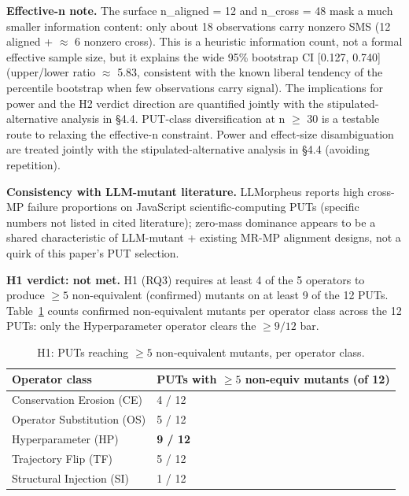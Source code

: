 \documentclass[review,12pt,authoryear]{elsarticle}
\begin{document}
\textbf{Effective-n note.} The surface n\_aligned = 12 and n\_cross = 48
mask a much smaller information content: only about 18 observations carry
nonzero SMS (12 aligned + $\approx$ 6 nonzero cross). This is a heuristic
information count, not a formal effective sample size, but it explains the
wide 95\% bootstrap CI {[}0.127, 0.740{]} (upper/lower ratio $\approx$
5.83, consistent with the known liberal tendency of the percentile
bootstrap when few observations carry signal). The implications for power and the H2 verdict direction are
quantified jointly with the stipulated-alternative analysis in §4.4.
PUT-class diversification at n $\geq$ 30 is a testable route to relaxing
the effective-n constraint. Power and effect-size disambiguation are
treated jointly with the stipulated-alternative analysis in §4.4
(avoiding repetition).

\textbf{Consistency with LLM-mutant literature.} \citet{tip2025llmorpheus}
LLMorpheus reports high cross-MP failure proportions on JavaScript
scientific-computing PUTs (specific numbers not listed in cited
literature); zero-mass dominance appears to be a shared characteristic
of LLM-mutant + existing MR-MP alignment designs, not a quirk of this
paper's PUT selection.

\textbf{H1 verdict: not met.} H1 (RQ3) requires at least 4 of the 5
operators to produce $\geq 5$ non-equivalent (confirmed) mutants on at
least 9 of the 12 PUTs. Table~\ref{tab:p2-32} counts confirmed
non-equivalent mutants per operator class across the 12 PUTs: only the
Hyperparameter operator clears the $\geq 9/12$ bar.

{\def\LTcaptype{table} %
\begin{longtable}[]{@{}ll@{}}
\caption{H1: PUTs reaching $\geq 5$ non-equivalent mutants, per operator
class.}\label{tab:p2-32}\\
\toprule\noalign{}
Operator class & PUTs with $\geq 5$ non-equiv mutants (of 12) \\
\midrule\noalign{}
\endfirsthead
\endhead
\bottomrule\noalign{}
\endlastfoot
Conservation Erosion (CE) & 4 / 12 \\
Operator Substitution (OS) & 5 / 12 \\
Hyperparameter (HP) & \textbf{9 / 12} \\
Trajectory Flip (TF) & 5 / 12 \\
Structural Injection (SI) & 1 / 12 \\
\end{longtable}
}
\end{document}
